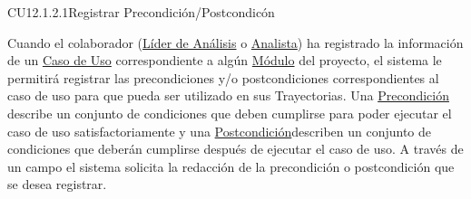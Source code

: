 	\begin{UseCase}{CU12.1.2.1}{Registrar Precondición/Postcondicón}{
			
				Cuando el colaborador (\hyperlink{jefe}{Líder de Análisis} o \hyperlink{analista}{Analista}) ha registrado la información de un \hyperlink{casoUso}{Caso de Uso} correspondiente a algún \hyperlink{moduloEntidad}{Módulo} del proyecto, el sistema le permitirá registrar las precondiciones y/o postcondiciones correspondientes al caso de uso para que pueda ser utilizado en sus Trayectorias. Una \hyperlink{entidadPrecondicion}{Precondición} describe un conjunto de condiciones que deben cumplirse para poder ejecutar el caso de uso satisfactoriamente y  una \hyperlink{entidadPostcondicion}{Postcondición}describen un conjunto de condiciones que deberán cumplirse después de ejecutar el caso de uso. A través de un campo el sistema solicita la redacción de la precondición o postcondición que se desea registrar.\\
			
}
\end{UseCase}
